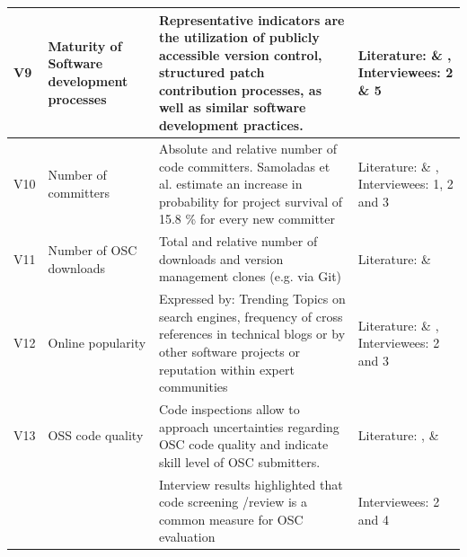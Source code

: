 \documentclass[final,5p,times,twocolumn]{elsarticle}
\begin{document}
\begin{table}
\begin{tabular}{|p{0.5cm}|p{2.5cm}|p{10cm}|p{3.5cm}|}
   V9  & Maturity of Software development processes & Representative indicators are the utilization of publicly accessible version control, structured patch contribution processes, as well as similar software development practices. & Literature:\cite{Michlmayr2005} \& \cite{Maki-Asiala2006}, Interviewees: 2 \& 5               \\ \hline
    V10 &                   Number of committers                       &                   Absolute and relative number of code committers. Samoladas et al. estimate an increase in probability for project survival of 15.8 \% for every new committer \cite{Samoladas2010}                                                                                                                                                                                                                     & Literature: \cite{Samoladas2010} \& \cite{Crowston2003}, Interviewees: 1, 2 and 3                 \\ \hline
    V11 &                   Number of OSC downloads                    &                   Total and relative number of downloads and version management clones                   (e.g. via Git)                                                                                                                                                 & Literature:\cite{Raja2006} \& \cite{Maki-Asiala2006}          \\ \hline
   V12 &                   Online popularity                          & Expressed by:                   Trending Topics on search engines,              frequency of cross references in technical blogs or by other software projects or reputation within expert communities                                                                                & Literature: \cite{Weiss2005} \& \cite{Immonen2007}, Interviewees: 2 and 3              \\ \hline
    V13 &                   OSS code quality                           &                   Code inspections allow to approach uncertainties regarding OSC code quality and indicate skill level of OSC submitters.                                                                                                                                             & Literature: \cite{Maki-Asiala2006}, \cite{Parizi2010} \& \cite{Samoladas2008} \\
    ~   & ~                                                            &                   Interview results highlighted that code screening /review is a common measure for OSC evaluation                                                                                                                                                                    &                   Interviewees: 2 and 4                                          \\ \hline

\end{tabular}
\end{table}
\end{document}
